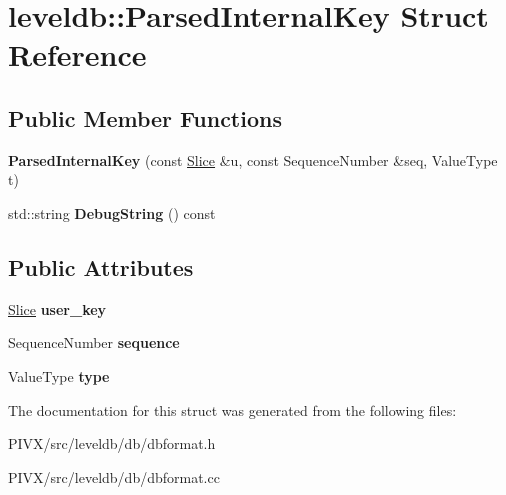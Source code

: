 \hypertarget{structleveldb_1_1_parsed_internal_key}{}\section{leveldb\+:\+:Parsed\+Internal\+Key Struct Reference}
\label{structleveldb_1_1_parsed_internal_key}
\subsection*{Public Member Functions}
\begin{DoxyCompactItemize}
\item 
\mbox{\label{structleveldb_1_1_parsed_internal_key_acc24f6ddeb4223d0484613076a48a9a1}} 
{\bfseries Parsed\+Internal\+Key} (const \mbox{\hyperlink{classleveldb_1_1_slice}{Slice}} \&u, const Sequence\+Number \&seq, Value\+Type t)
\item 
\mbox{\label{structleveldb_1_1_parsed_internal_key_a5371a83d503751e8ea7cc23fa16c8bfd}} 
std\+::string {\bfseries Debug\+String} () const
\end{DoxyCompactItemize}
\subsection*{Public Attributes}
\begin{DoxyCompactItemize}
\item 
\mbox{\label{structleveldb_1_1_parsed_internal_key_aa6e30fcf3c95fc1485d60fa08efe2b9d}} 
\mbox{\hyperlink{classleveldb_1_1_slice}{Slice}} {\bfseries user\+\_\+key}
\item 
\mbox{\label{structleveldb_1_1_parsed_internal_key_a3ab7f4382bc026081875fde4dea95e61}} 
Sequence\+Number {\bfseries sequence}
\item 
\mbox{\label{structleveldb_1_1_parsed_internal_key_ac7c10a6f60f93982b886ad1fbbafd6c2}} 
Value\+Type {\bfseries type}
\end{DoxyCompactItemize}


The documentation for this struct was generated from the following files\+:\begin{DoxyCompactItemize}
\item 
P\+I\+V\+X/src/leveldb/db/dbformat.\+h\item 
P\+I\+V\+X/src/leveldb/db/dbformat.\+cc\end{DoxyCompactItemize}

